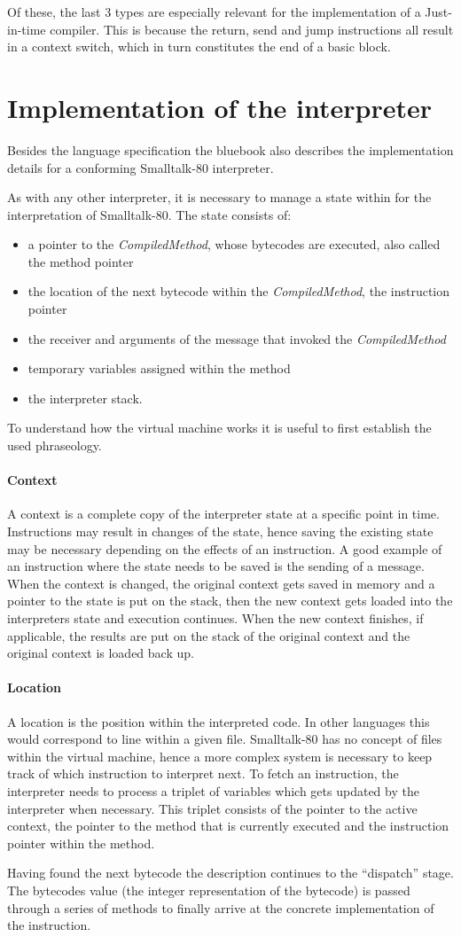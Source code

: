 Of these, the last 3 types are especially relevant for the implementation of a Just-in-time compiler. 
This is because the return, send and jump instructions all result in a context switch, which in turn constitutes the end of a basic block.

\section{Implementation of the interpreter}
Besides the language specification the bluebook also describes the implementation details for a conforming Smalltalk-80 interpreter. 

As with any other interpreter, it is necessary to manage a state within for the interpretation of Smalltalk-80.
The state consists of:
\begin{itemize}
  \item a pointer to the \emph{CompiledMethod}, whose bytecodes are executed, also called the method pointer
  \item the location of the next bytecode within the \emph{CompiledMethod}, the instruction pointer 
  \item the receiver and arguments of the message that invoked the \emph{CompiledMethod}
  \item temporary variables assigned within the method 
  \item the interpreter stack.
\end{itemize}

To understand how the virtual machine works it is useful to first establish the used phraseology. 

\paragraph{Context}
A context is a complete copy of the interpreter state at a specific point in time. Instructions may result in changes of the state, hence saving the existing state may be necessary depending on the effects of an instruction. 
A good example of an instruction where the state needs to be saved is the sending of a message. 
When the context is changed, the original context gets saved in memory and a pointer to the state is put on the stack, then the new context gets loaded into the interpreters state and execution continues. When the new context finishes, if applicable, the results are put on the stack of the original context and the original context is loaded back up.

\paragraph{Location} 
A location is the position within the interpreted code. In other languages this would correspond to line within a given file.
Smalltalk-80 has no concept of files within the virtual machine, hence a more complex system is necessary to keep track of which instruction to interpret next.
To fetch an instruction, the interpreter needs to process a triplet of variables which gets updated by the interpreter when necessary. 
This triplet consists of the pointer to the active context, the pointer to the method that is currently executed and the instruction pointer within the method.

Having found the next bytecode the description continues to the \enquote{dispatch} stage. The bytecodes value (the integer representation of the bytecode) is passed through a series of methods to finally arrive at the concrete implementation of the instruction. 


